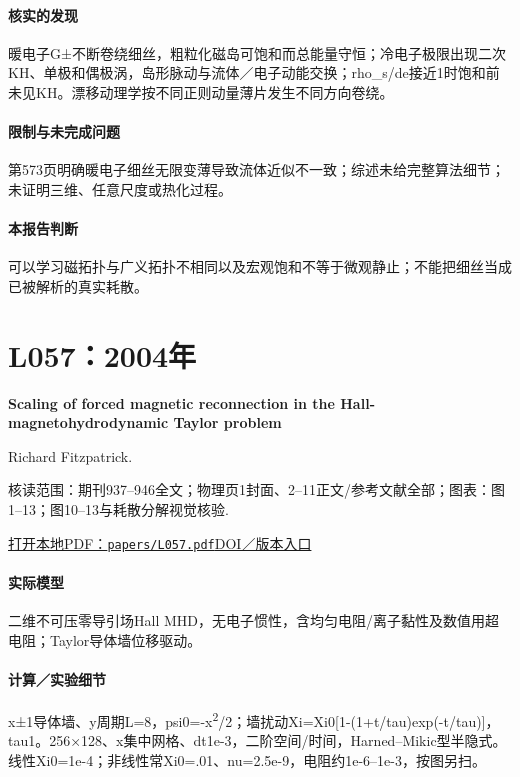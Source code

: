 \paragraph{核实的发现}暖电子G±不断卷绕细丝，粗粒化磁岛可饱和而总能量守恒；冷电子极限出现二次KH、单极和偶极涡，岛形脉动与流体／电子动能交换；rho\_s/de接近1时饱和前未见KH。漂移动理学按不同正则动量薄片发生不同方向卷绕。

\paragraph{限制与未完成问题}第573页明确暖电子细丝无限变薄导致流体近似不一致；综述未给完整算法细节；未证明三维、任意尺度或热化过程。

\paragraph{本报告判断}可以学习磁拓扑与广义拓扑不相同以及宏观饱和不等于微观静止；不能把细丝当成已被解析的真实耗散。

\section{L057：2004年}\label{paper:L057}

\textbf{Scaling of forced magnetic reconnection in the Hall-magnetohydrodynamic Taylor problem}\citep{L057}\

Richard Fitzpatrick.

\textsf{核读范围：}期刊937–946全文；物理页1封面、2–11正文/参考文献全部；\textsf{图表：}图1–13；图10–13与耗散分解视觉核验.

\href{run:papers/L057.pdf}{打开本地PDF：\texttt{papers/L057.pdf}}\quad\href{https://doi.org/10.1063/1.1640378}{DOI／版本入口}

\paragraph{实际模型}二维不可压零导引场Hall MHD，无电子惯性，含均匀电阻/离子黏性及数值用超电阻；Taylor导体墙位移驱动。

\paragraph{计算／实验细节}x±1导体墙、y周期L=8，psi0=-x\textsuperscript{2}/2；墙扰动Xi=Xi0[1-(1+t/tau)exp(-t/tau)]，tau1。256×128、x集中网格、dt1e-3，二阶空间/时间，Harned–Mikic型半隐式。线性Xi0=1e-4；非线性常Xi0=.01、nu=2.5e-9，电阻约1e-6–1e-3，按图另扫。

